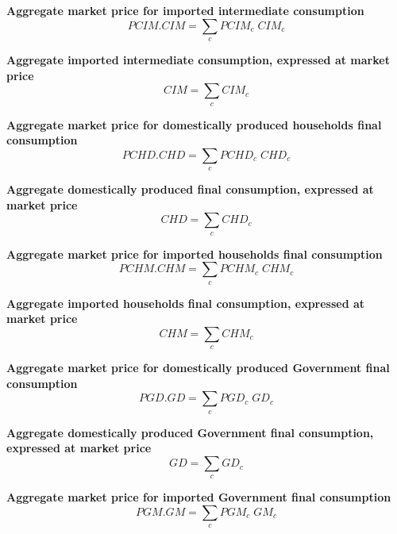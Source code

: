 \documentclass[12pt]{article}
\numberwithin{equation}{section}
\begin{document}
\noindent\textbf{Aggregate market price for imported intermediate consumption} \\
\begin{dmath}
PCIM . CIM = \sum_{c} PCIM_{c} \; CIM_{c}
\end{dmath}

\noindent\textbf{ Aggregate imported intermediate consumption, expressed at market price} \\
\begin{dmath}
CIM = \sum_{c} CIM_{c}
\end{dmath}

\noindent\textbf{Aggregate market price for domestically produced households final consumption} \\
\begin{dmath}
PCHD . CHD = \sum_{c} PCHD_{c} \; CHD_{c}
\end{dmath}

\noindent\textbf{Aggregate domestically produced final consumption, expressed at market price} \\
\begin{dmath}
CHD = \sum_{c} CHD_{c}
\end{dmath}

\noindent\textbf{Aggregate market price for imported households final consumption} \\
\begin{dmath}
PCHM . CHM = \sum_{c} PCHM_{c} \; CHM_{c}
\end{dmath}

\noindent\textbf{Aggregate imported households final consumption, expressed at market price} \\
\begin{dmath}
CHM = \sum_{c} CHM_{c}
\end{dmath}

\noindent\textbf{Aggregate market price for domestically produced Government final consumption} \\
\begin{dmath}
PGD . GD = \sum_{c} PGD_{c} \; GD_{c}
\end{dmath}

\noindent\textbf{Aggregate domestically produced Government final consumption, expressed at market price} \\
\begin{dmath}
GD = \sum_{c} GD_{c}
\end{dmath}

\noindent\textbf{Aggregate market price for imported Government final consumption} \\
\begin{dmath}
PGM . GM = \sum_{c} PGM_{c} \; GM_{c}
\end{dmath}
\end{document}
